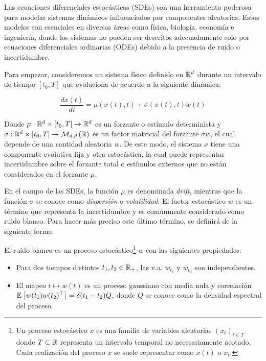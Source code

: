 Las ecuaciones diferenciales estocásticas (SDEs) son una herramienta poderosa para modelar sistemas dinámicos influenciados por componentes aleatorias. Estos modelos son esenciales en diversas áreas como física, biología, economía e ingeniería, donde los sistemas no pueden ser descritos adecuadamente solo por ecuaciones diferenciales ordinarias (ODEs) debido a la presencia de ruido o incertidumbre.

Para empezar, consideremos un sistema físico definido en $\mathbb{R}^d$ durante un intervalo de tiempo $[t_0,T]$ que evoluciona de acuerdo a la siguiente dinámica:

\begin{equation}
    \frac{dx(t)}{dt} = \mu(x(t),t) + \sigma(x(t),t)w(t)
    \label{eq:sde_as_derivative}
\end{equation}

Donde $\mu:\mathbb{R}^d\times [t_0,T]\to\mathbb{R}^d$ es un forzante o estímulo determinista y $\sigma:\mathbb{R}^d\times [t_0,T]\to\mathcal{M}_{d,d}\left(\mathbb{R}\right)$ es un factor matricial del forzante $\sigma w$, el cual depende de una cantidad aleatoria $w$. De este modo, el sistema $x$ tiene una componente evolutiva fija y otra estocástica, la cual puede representar incertidumbre sobre el forzante total o estímulos externos que no están considerados en el forzante $\mu$.

En el campo de las SDEs, la función $\mu$ es denominada \textit{drift}, mientras que la función $\sigma$ se conoce como \textit{dispersión} o \textit{volatilidad}. El factor estocástico $w$ es un término que representa la incertidumbre y es comúnmente considerado como ruido blanco. Para hacer más preciso este último término, se definirá de la siguiente forma:

\begin{defn}
    El ruido blanco es un proceso estocástico\footnote{Un proceso estocástico $x$ es una familia de variables aleatorias $(x_t)_{t\in T}$ donde $T\subset{\mathbb{R}}$ representa un intervalo temporal no necesariamente acotado. Cada realización del proceso $x$ se suele representar como $x(t)$ o $x_t$.} $w$ con las siguientes propiedades:

    \begin{itemize}
        \item Para dos tiempos distintos $t_1, t_2\in\mathbb{R}_+$, las v.a. $w_{t_1}$ y $w_{t_2}$ son independientes.
        \item El mapeo $t\mapsto w(t)$ es un proceso gaussiano con media nula y correlación $\mathbb{E}_{}\left[w(t_1)w(t_2)^\top\right]=\delta(t_1-t_2)Q$, donde $Q$ se conoce como la densidad espectral del proceso.
    \end{itemize}
\end{defn}

